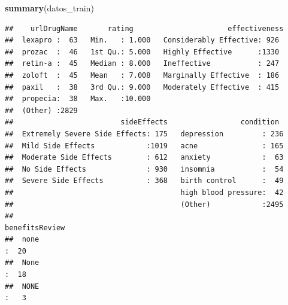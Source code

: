 \documentclass[spanish,]{article}
\newenvironment{Shaded}{\begin{snugshade}}{\end{snugshade}}
\newcommand{\KeywordTok}[1]{\textcolor[rgb]{0.13,0.29,0.53}{\textbf{#1}}}
\newcommand{\NormalTok}[1]{#1}
\begin{document}
\begin{Shaded}
\begin{Highlighting}[]
\KeywordTok{summary}\NormalTok{(datos_train)}
\end{Highlighting}
\end{Shaded}

\begin{verbatim}
##    urlDrugName       rating                      effectiveness 
##  lexapro :  63   Min.   : 1.000   Considerably Effective: 926  
##  prozac  :  46   1st Qu.: 5.000   Highly Effective      :1330  
##  retin-a :  45   Median : 8.000   Ineffective           : 247  
##  zoloft  :  45   Mean   : 7.008   Marginally Effective  : 186  
##  paxil   :  38   3rd Qu.: 9.000   Moderately Effective  : 415  
##  propecia:  38   Max.   :10.000                                
##  (Other) :2829                                                 
##                         sideEffects                 condition   
##  Extremely Severe Side Effects: 175   depression         : 236  
##  Mild Side Effects            :1019   acne               : 165  
##  Moderate Side Effects        : 612   anxiety            :  63  
##  No Side Effects              : 930   insomnia           :  54  
##  Severe Side Effects          : 368   birth control      :  49  
##                                       high blood pressure:  42  
##                                       (Other)            :2495  
##                                                                                                                                                                                                                                                                                                                          benefitsReview
##  none                                                                                                                                                                                                                                                                                                                           :  20  
##  None                                                                                                                                                                                                                                                                                                                           :  18  
##  NONE                                                                                                                                                                                                                                                                                                                           :   3  

\end{verbatim}
\end{document}
